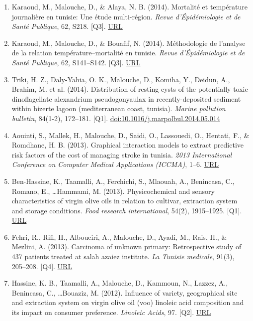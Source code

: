 \documentclass[11pt,a4paper,sans]{moderncv}
\begin{document}
\begin{enumerate}
\item Karaoud, M., Malouche, D., \& Alaya, N. B. (2014). Mortalité et température journalière en tunisie: Une étude multi-région. \textit{Revue d'Épidémiologie et de Santé Publique}, 62, S218. [Q3]. \href{https://www.em-consulte.com/article/915651/article/mortalite-et-temperature-journaliere-en-tunisie\%C2\%A0-u}{URL}
\item Karaoud, M., Malouche, D., \& Bouafif, N. (2014). Méthodologie de l'analyse de la relation température–mortalité en tunisie. \textit{Revue d'Épidémiologie et de Santé Publique}, 62, S141–S142. [Q3]. \href{https://www.em-consulte.com/article/911552/article/methodologie-de-l-analyse-de-la-relation-temperatu}{URL}
\item Triki, H. Z., Daly-Yahia, O. K., Malouche, D., Komiha, Y., Deidun, A., Brahim, M. et al. (2014). Distribution of resting cysts of the potentially toxic dinoflagellate alexandrium pseudogonyaulax in recently-deposited sediment within bizerte lagoon (mediterranean coast, tunisia). \textit{Marine pollution bulletin}, 84(1-2), 172–181. [Q1]. \href{https://doi.org/10.1016/j.marpolbul.2014.05.014}{doi:10.1016/j.marpolbul.2014.05.014}
\item Aouinti, S., Mallek, H., Malouche, D., Saidi, O., Lassouedi, O., Hentati, F., \& Romdhane, H. B. (2013). Graphical interaction models to extract predictive risk factors of the cost of managing stroke in tunisia. \textit{2013 International Conference on Computer Medical Applications (ICCMA)}, 1–6. \href{https://ieeexplore.ieee.org/document/6506162}{URL}
\item Ben-Hassine, K., Taamalli, A., Ferchichi, S., Mlaouah, A., Benincasa, C., Romano, E., \ldots Hammami, M. (2013). Physicochemical and sensory characteristics of virgin olive oils in relation to cultivar, extraction system and storage conditions. \textit{Food research international}, 54(2), 1915–1925. [Q1]. \href{https://scholar.cnki.net/Detail/doi/GARJ2013/SJES14010600411056}{URL}
\item Fehri, R., Rifi, H., Alboueiri, A., Malouche, D., Ayadi, M., Rais, H., \& Mezlini, A. (2013). Carcinoma of unknown primary: Retrospective study of 437 patients treated at salah azaiez institute. \textit{La Tunisie medicale}, 91(3), 205–208. [Q4]. \href{https://www.latunisiemedicale.com/article-medicale-tunisie_2165_en}{URL}
\item Hassine, K. B., Taamalli, A., Malouche, D., Kammoun, N., Lazzez, A., Benincasa, C., \ldots Bouaziz, M. (2012). Influence of variety, geographical site and extraction system on virgin olive oil (voo) linoleic acid composition and its impact on consumer preference. \textit{Linoleic Acids}, 97. [Q2]. \href{https://www.researchgate.net/publication/288652330_Influence_of_variety_geographical_site_and_extraction_system_on_virgin_olive_oil_VOO_linoleic_acid_composition_and_its_impact_on_consumer_preference}{URL}

\end{enumerate}
\end{document}
